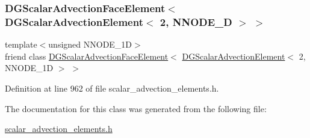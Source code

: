 \subsubsection{\texorpdfstring{D\+G\+Scalar\+Advection\+Face\+Element$<$ D\+G\+Scalar\+Advection\+Element$<$ 2, N\+N\+O\+D\+E\+\_\+D $>$ $>$}{DGScalarAdvectionFaceElement< DGScalarAdvectionElement< 2, NNODE\_1D > >}}
{\footnotesize\ttfamily template$<$unsigned N\+N\+O\+D\+E\+\_\+1D$>$ \\
friend class \hyperlink{classoomph_1_1DGScalarAdvectionFaceElement}{D\+G\+Scalar\+Advection\+Face\+Element}$<$ \hyperlink{classoomph_1_1DGScalarAdvectionElement}{D\+G\+Scalar\+Advection\+Element}$<$ 2, N\+N\+O\+D\+E\+\_\+1D $>$ $>$\hspace{0.3cm}{\ttfamily [friend]}}



Definition at line 962 of file scalar\+\_\+advection\+\_\+elements.\+h.



The documentation for this class was generated from the following file\+:\begin{DoxyCompactItemize}
\item 
\hyperlink{scalar__advection__elements_8h}{scalar\+\_\+advection\+\_\+elements.\+h}\end{DoxyCompactItemize}
